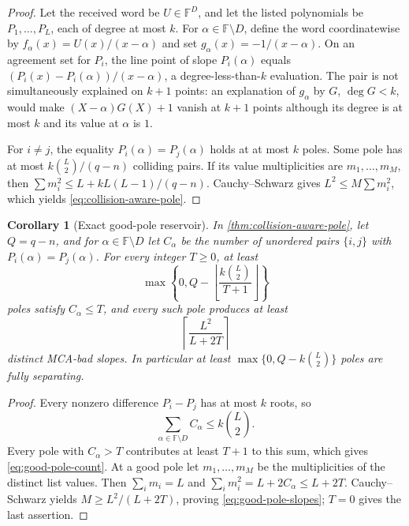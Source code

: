 \documentclass[11pt,a4paper]{amsart}
\numberwithin{equation}{section}
\newtheorem{corollary}[corollary]{Corollary}
\theoremstyle{remark}
\newcommand{\F}{\mathbb F}
\newcommand{\floor}[1]{\left\lfloor #1\right\rfloor}
\newcommand{\ceil}[1]{\left\lceil #1\right\rceil}
\begin{document}
\begin{proof}
Let the received word be \(U\in\F^D\), and let the listed polynomials be
\(P_1,\ldots,P_L\), each of degree at most \(k\).  For
\(\alpha\in\F\setminus D\), define the word coordinatewise by
\(f_\alpha(x)=U(x)/(x-\alpha)\) and set
\(g_\alpha(x)=-1/(x-\alpha)\).  On an agreement set for \(P_i\), the line
point of slope \(P_i(\alpha)\) equals
\((P_i(x)-P_i(\alpha))/(x-\alpha)\), a degree-less-than-\(k\) evaluation.
The pair is not simultaneously explained on \(k+1\) points: an explanation
of \(g_\alpha\) by \(G\), \(\deg G<k\), would make
\((X-\alpha)G(X)+1\) vanish at \(k+1\) points although its degree is at
most \(k\) and its value at \(\alpha\) is \(1\).

For \(i\ne j\), the equality \(P_i(\alpha)=P_j(\alpha)\) holds at at most
\(k\) poles.  Some pole has at most \(k\binom L2/(q-n)\) colliding pairs.
If its value multiplicities are \(m_1,\ldots,m_M\), then
\(\sum m_i^2\le L+kL(L-1)/(q-n)\).  Cauchy--Schwarz gives
\(L^2\le M\sum m_i^2\), which yields \eqref{eq:collision-aware-pole}.
\end{proof}

\begin{corollary}[Exact good-pole reservoir]
\label{cor:exact-good-pole-reservoir}
In \cref{thm:collision-aware-pole}, let \(Q=q-n\), and for
\(\alpha\in\F\setminus D\) let \(C_\alpha\) be the number of unordered
pairs \(\{i,j\}\) with \(P_i(\alpha)=P_j(\alpha)\).  For every integer
\(T\ge0\), at least
\[
 \max\left\{0,Q-
   \floor{\frac{k\binom L2}{T+1}}\right\}          \tag{PR1}
\label{eq:good-pole-count}
\]
poles satisfy \(C_\alpha\le T\), and every such pole produces at least
\[
                     \ceil{\frac{L^2}{L+2T}}       \tag{PR2}
\label{eq:good-pole-slopes}
\]
distinct MCA-bad slopes.  In particular at least
\(\max\{0,Q-k\binom L2\}\) poles are fully separating.
\end{corollary}

\begin{proof}
Every nonzero difference \(P_i-P_j\) has at most \(k\) roots, so
\[
                 \sum_{\alpha\in\F\setminus D}C_\alpha
                    \le k\binom L2.
\]
Every pole with \(C_\alpha>T\) contributes at least \(T+1\) to this
sum, which gives \eqref{eq:good-pole-count}.  At a good
pole let \(m_1,\ldots,m_M\) be the multiplicities of the distinct list
values.  Then
\(\sum_im_i=L\) and
\(\sum_im_i^2=L+2C_\alpha\le L+2T\).  Cauchy--Schwarz yields
\(M\ge L^2/(L+2T)\), proving \eqref{eq:good-pole-slopes}; \(T=0\)
gives the last assertion.
\end{proof}
\end{document}
